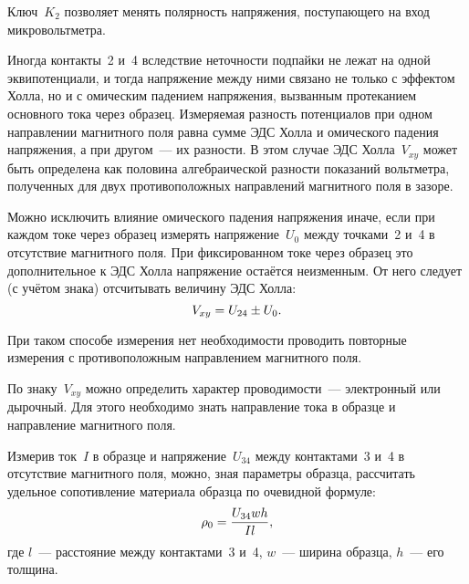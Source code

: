Ключ~$K_2$ позволяет менять полярность напряжения, поступающего на вход
микровольтметра.

Иногда контакты~2 и~4 вследствие неточности подпайки не лежат на одной
эквипотенциали, и тогда напряжение между ними связано не только с эффектом
Холла, но и с омическим падением напряжения, вызванным протеканием основного
тока через образец. Измеряемая разность потенциалов при одном направлении
магнитного поля равна сумме ЭДС Холла и омического падения напряжения, а при
другом~--- их разности. В этом случае ЭДС Холла~$V_{xy}$ может быть определена
как половина алгебраической разности показаний вольтметра, полученных для двух
противоположных направлений магнитного поля в зазоре.

Можно исключить влияние омического падения напряжения иначе, если при каждом
токе через образец измерять
напряжение~$U_0$ между точками~2 и~4 в отсутствие магнитного поля. При
фиксированном токе через образец это
дополнительное к ЭДС Холла напряжение остаётся неизменным. От него следует (с
учётом знака) отсчитывать величину ЭДС Холла:
\begin{equation}
	V_{xy}=U_{24}\pm U_0.
	\eqmark{3.5.1}
\end{equation}

При таком способе измерения нет необходимости проводить повторные измерения с
противоположным направлением магнитного поля.

По знаку~$V_{xy}$ можно определить характер проводимости~--- электронный или
дырочный. Для этого необходимо знать направление тока в образце и направление
магнитного поля.

Измерив ток~$I$ в образце и напряжение~$U_{34}$ между контактами~3 и~4 в
отсутствие магнитного поля, можно, зная параметры образца, рассчитать удельное
сопотивление материала образца по очевидной формуле:
\begin{equation}
	\rho_0=\frac{U_{34}wh}{Il},
	\eqmark{3.5.2}
\end{equation}
где $l$~--- расстояние между контактами~3 и~4, $w$~--- ширина образца, $h$~---
его толщина.

